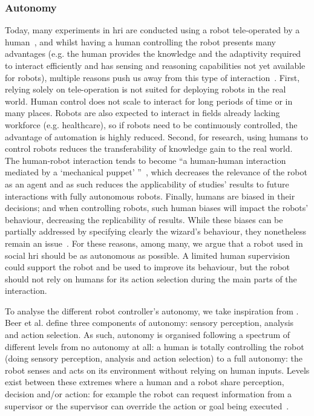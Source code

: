 \subsubsection{Autonomy}

Today, many experiments in \gls{hri} are conducted using a robot tele-operated by a human~\citep{riek2012wizard,baxter2016characterising}, and whilst having a human controlling the robot presents many advantages (e.g. the human provides the knowledge and the adaptivity required to interact efficiently and has sensing and reasoning capabilities not yet available for robots), multiple reasons push us away from this type of interaction~\citep{thill2012robot}. First, relying solely on tele-operation is not suited for deploying robots in the real world. Human control does not scale to interact for long periods of time or in many places. Robots are also expected to interact in fields already lacking workforce (e.g. healthcare), so if robots need to be continuously controlled, the advantage of automation is highly reduced. Second, for research, using humans to control robots reduces the transferability of knowledge gain to the real world. The human-robot interaction tends to become ``a human-human interaction mediated by a `mechanical puppet' ''~\citep{baxter2016characterising}, which decreases the relevance of the robot as an agent and as such reduces the applicability of studies' results to future interactions with fully autonomous robots. Finally, humans are biased in their decisions; and when controlling robots, such human biases will impact the robots' behaviour, decreasing the replicability of results. While these biases can be partially addressed by specifying clearly the wizard's behaviour, they nonetheless remain an issue~\cite{riek2012wizard}. For these reasons, among many, we argue that a robot used in social \gls{hri} should be as autonomous as possible. A limited human supervision could support the robot and be used to improve its behaviour, but the robot should not rely on humans for its action selection during the main parts of the interaction. 
	
To analyse the different robot controller's autonomy, we take inspiration from \citet{beer2014toward}. Beer et al. define three components of autonomy: sensory perception, analysis and action selection. As such, autonomy is organised following a spectrum of different levels from no autonomy at all: a human is totally controlling the robot (doing sensory perception, analysis and action selection) to a full autonomy: the robot senses and acts on its environment without relying on human inputs. Levels exist between these extremes where a human and a robot share perception, decision and/or action: for example the robot can request information from a supervisor or the supervisor can override the action or goal being executed~\citep{sheridan1978human}.

